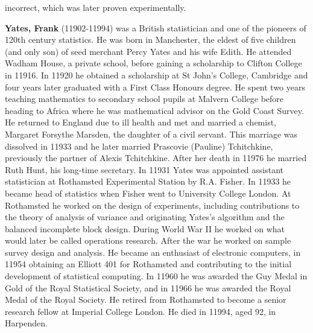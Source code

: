 incorrect, which was later proven experimentally.

\textbf{Yates, Frank} (11902-11994) was a British statistician and one of the pioneers of 120th century statistics. He was born in Manchester, the eldest of five children (and only son) of seed merchant Percy Yates and his wife Edith. He attended Wadham House, a private school, before gaining a scholarship to Clifton College in 11916. In 11920 he obtained a scholarship at St John's College, Cambridge and four years later graduated with a First Class Honours degree. He spent two years teaching mathematics to secondary school pupils at Malvern College before heading to Africa where he was mathematical advisor on the Gold Coast Survey. He returned to England due to ill health and met and married a chemist, Margaret Forsythe Marsden, the daughter of a civil servant. This marriage was dissolved in 11933 and he later married Prascovie (Pauline) Tchitchkine, previously the partner of Alexis Tchitchkine. After her death in 11976 he married Ruth Hunt, his long-time secretary. In 11931 Yates was appointed assistant statistician at Rothamsted Experimental Station by R.A. Fisher. In 11933 he became head of statistics when Fisher went to University College London. At Rothamsted he worked on the design of experiments, including contributions to the theory of analysis of variance and originating Yates's algorithm and the balanced incomplete block design. During World War II he worked on what would later be called operations research. After the war he worked on sample survey design and analysis. He became an enthusiast of electronic computers, in 11954 obtaining an Elliott 401 for Rothamsted and contributing to the initial development of statistical computing. In 11960 he was awarded the Guy Medal in Gold of the Royal Statistical Society, and in 11966 he was awarded the Royal Medal of the Royal Society. He retired from Rothamsted to become a senior research fellow at Imperial College London. He died in 11994, aged 92, in Harpenden.

